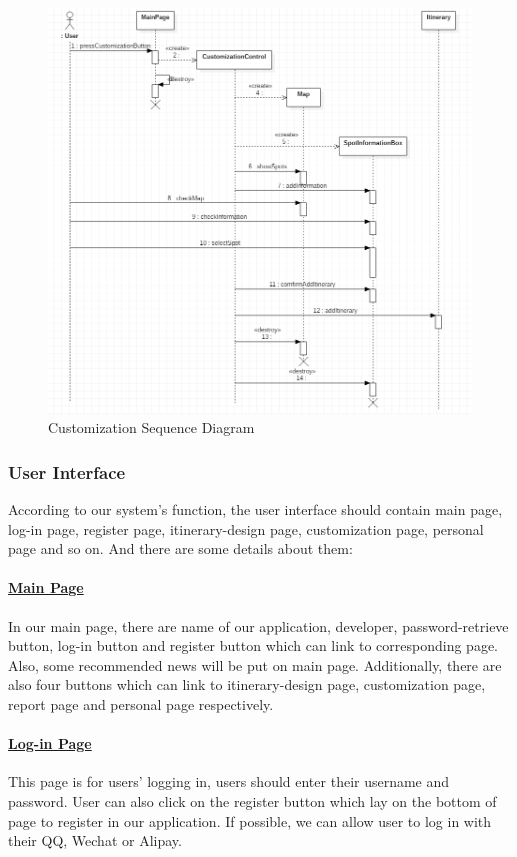 \documentclass[10pt]{article}
\begin{document}
\begin{figure}[H]
	\centering
	\includegraphics[width=14cm]{customization.png} 
	\caption{Customization Sequence Diagram}
	\label{Customization Sequence Diagram}
\end{figure}

\subsubsection{User Interface} 
According to our system’s function, the user interface should contain main page, log-in page, register page, itinerary-design page, customization page, personal page and so on. And there are some details about them:

\paragraph{\underline{Main Page}}
In our main page, there are name of our application, developer, password-retrieve button, log-in button and register button which can link to corresponding page. Also, some recommended news will be put on main page. Additionally, there are also four buttons which can link to itinerary-design page, customization page, report page and personal page respectively.

\paragraph{\underline{Log-in Page}}
This page is for users’ logging in, users should enter their username and password. User can also click on the register button which lay on the bottom of page to register in our application. If possible, we can allow user to log in with their QQ, Wechat or Alipay.
\end{document}
